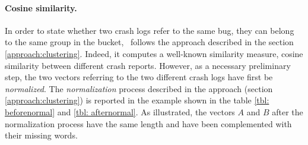 \paragraph{Cosine similarity.} 
In order to state whether two crash logs refer to the same bug, \ie they can belong to the same group in the bucket, \toolname\ follows the approach described in the section \ref{approach:clustering}. 
Indeed, it computes a well-known similarity measure, \ie cosine similarity \cite{cosine} between different crash reports.
However, as a necessary preliminary step, the two vectors referring to the two different crash logs have first be \textit{normalized}. 
The \textit{normalization} process described in the approach (section \ref{approach:clustering}) is reported in the example shown in the table \ref{tbl: beforenormal} and \ref{tbl: afternormal}.
As illustrated, the vectors $A$ and $B$ after the normalization process have the same length and have been complemented with their missing words. 
